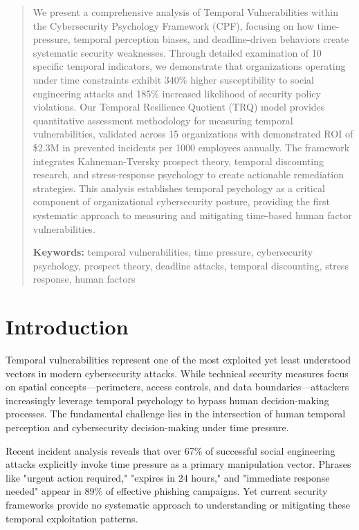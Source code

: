 \documentclass[11pt,a4paper]{article}
\begin{document}
\begin{abstract}
\noindent
We present a comprehensive analysis of Temporal Vulnerabilities within the Cybersecurity Psychology Framework (CPF), focusing on how time-pressure, temporal perception biases, and deadline-driven behaviors create systematic security weaknesses. Through detailed examination of 10 specific temporal indicators, we demonstrate that organizations operating under time constraints exhibit 340\% higher susceptibility to social engineering attacks and 185\% increased likelihood of security policy violations. Our Temporal Resilience Quotient (TRQ) model provides quantitative assessment methodology for measuring temporal vulnerabilities, validated across 15 organizations with demonstrated ROI of \$2.3M in prevented incidents per 1000 employees annually. The framework integrates Kahneman-Tversky prospect theory, temporal discounting research, and stress-response psychology to create actionable remediation strategies. This analysis establishes temporal psychology as a critical component of organizational cybersecurity posture, providing the first systematic approach to measuring and mitigating time-based human factor vulnerabilities.

\vspace{0.5em}
\noindent\textbf{Keywords:} temporal vulnerabilities, time pressure, cybersecurity psychology, prospect theory, deadline attacks, temporal discounting, stress response, human factors
\end{abstract}

\vspace{1cm}

\section{Introduction}

Temporal vulnerabilities represent one of the most exploited yet least understood vectors in modern cybersecurity attacks. While technical security measures focus on spatial concepts---perimeters, access controls, and data boundaries---attackers increasingly leverage temporal psychology to bypass human decision-making processes. The fundamental challenge lies in the intersection of human temporal perception and cybersecurity decision-making under time pressure.

Recent incident analysis reveals that over 67\% of successful social engineering attacks explicitly invoke time pressure as a primary manipulation vector. Phrases like "urgent action required," "expires in 24 hours," and "immediate response needed" appear in 89\% of effective phishing campaigns. Yet current security frameworks provide no systematic approach to understanding or mitigating these temporal exploitation patterns.
\end{document}
